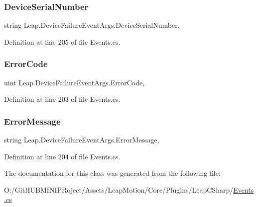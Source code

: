 \subsubsection{\texorpdfstring{DeviceSerialNumber}{DeviceSerialNumber}}
{\footnotesize\ttfamily string Leap.\+Device\+Failure\+Event\+Args.\+Device\+Serial\+Number\hspace{0.3cm}{\ttfamily [get]}, {\ttfamily [set]}}



Definition at line 205 of file Events.\+cs.

\mbox{\label{class_leap_1_1_device_failure_event_args_a1f1596fcef7f079254b86fc04e0d0822}} 
\subsubsection{\texorpdfstring{ErrorCode}{ErrorCode}}
{\footnotesize\ttfamily uint Leap.\+Device\+Failure\+Event\+Args.\+Error\+Code\hspace{0.3cm}{\ttfamily [get]}, {\ttfamily [set]}}



Definition at line 203 of file Events.\+cs.

\mbox{\label{class_leap_1_1_device_failure_event_args_a71ceae770192fda22d991ccef959c15b}} 
\subsubsection{\texorpdfstring{ErrorMessage}{ErrorMessage}}
{\footnotesize\ttfamily string Leap.\+Device\+Failure\+Event\+Args.\+Error\+Message\hspace{0.3cm}{\ttfamily [get]}, {\ttfamily [set]}}



Definition at line 204 of file Events.\+cs.



The documentation for this class was generated from the following file\+:\begin{DoxyCompactItemize}
\item 
O\+:/\+Git\+H\+U\+B\+M\+I\+N\+I\+P\+Roject/\+Assets/\+Leap\+Motion/\+Core/\+Plugins/\+Leap\+C\+Sharp/\mbox{\hyperlink{_events_8cs}{Events.\+cs}}\end{DoxyCompactItemize}
